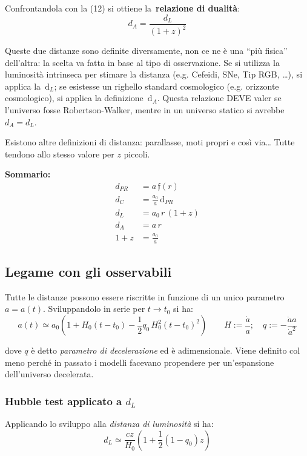 Confrontandola con la (12) si ottiene la~\textbf{relazione di dualità}:
\begin{equation}
d_A=\frac{d_L}{(1+z)^2}
\end{equation}

Queste due distanze sono definite diversamente, non ce ne è una ``più
fisica'' dell'altra: la scelta va fatta in base al tipo di osservazione.
Se si utilizza la luminosità intrinseca per
stimare la distanza (e.g. Cefeidi, SNe, Tip RGB, \ldots{}), si applica la~\(\mathrm{d}_L\); se
esistesse un righello standard cosmologico (e.g. orizzonte cosmologico),
si applica la definizione~\(\mathrm{d}_A\). Questa relazione DEVE
valer se l'universo fosse Robertson-Walker, mentre in un universo
statico si avrebbe~\(d_A=d_L\).~

Esistono altre definizioni di distanza: parallasse, moti propri e così
via\ldots{} Tutte tendono allo stesso valore per \(z\)
piccoli.

\par\null
\begin{definition}
  \textbf{Sommario:}
\begin{align*}
  d_{PR} & =a\,\mathfrak{f}(r)  \\ 
  d_{C} & =\frac{a_0}{a}\,\mathrm{d}_{PR}  \\ 
  d_L & = a_0 \, r\, (1+z)  \\ 
  d_A & =a\, r  \\
  1+z & =\frac{a_0}{a}
  \end{align*}
\end{definition}

\subsection{Legame con gli osservabili}

Tutte le distanze possono essere riscritte in funzione di un unico
parametro $a=a(t)$. Sviluppandolo in serie per $t\to t_0$ si ha:
\begin{equation}
a(t)\simeq a_0\left ( 1+H_0 (t-t_0)-\frac{1}{2}q_0\,H_0^2(t-t_0)^2  \right )\qquad 
H:=\frac{\dot{a}}{a}; \quad
q:=-\frac{\ddot{a} a}{\dot{a}^2} 
\end{equation}

dove $q$ è detto \emph{parametro di decelerazione} ed è adimensionale. Viene definito col meno perché in passato i modelli facevano propendere per un'espansione dell'universo decelerata. 

\subsubsection{Hubble test applicato a $d_L$}
Applicando lo sviluppo alla \emph{distanza di luminosità} si ha:
\begin{equation}
d_L\simeq \frac{cz}{H_0}\left ( 1 + \frac{1}{2}(1-q_0)z  \right )
\end{equation}

